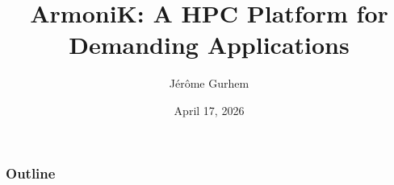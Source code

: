 \documentclass[13pt,aspectratio=1609]{beamer}
\begin{document}
\author{Jérôme Gurhem}
\title{ArmoniK: A HPC Platform for Demanding Applications}
\date{April 17, 2026}

\titlepage

\AtBeginSection[]
{
	\frame{\sectionpage}
}

\begin{frame}
	\frametitle{Outline}
	\tableofcontents
\end{frame}







\closingpage
\end{document}
